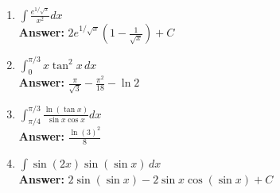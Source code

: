 \documentclass[letterpaper]{article}
\begin{document}
\begin{enumerate}
\begin{enumerate}
	\item $\int \frac{e^{1/\sqrt{x}}}{x^2}dx$
	\\ \textbf{Answer:} $2e^{1/\sqrt{x}}\left(1-\frac{1}{\sqrt x}\right)+C$

	\item $\int_0^{\pi/3} x\tan^2 x\,dx$
	\\ \textbf{Answer:} $\frac{\pi}{\sqrt{3}}-\frac{\pi^2}{18}-\ln 2$

	\item $\int_{\pi/4}^{\pi/3} \frac{\ln(\tan x)}{\sin x \cos x}dx$
	\\ \textbf{Answer:} $\frac{\ln(3)^2}{8}$

	\item $\int \sin(2x)\sin(\sin x)\,dx$
	\\ \textbf{Answer:} $2\sin(\sin x)-2\sin x\cos(\sin x)+C$
	\end{enumerate}


\end{enumerate}
\end{document}
